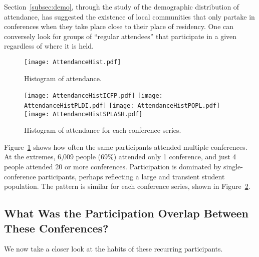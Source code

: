 Section~\ref{subsec:demo}, through the study of the demographic distribution of
attendance, has suggested the existence of local communities that only
partake in conferences when they take place close to their place of residency.
One can conversely look for groups of ``regular attendees'' that participate in
a given \conf regardless of where it is held.

\begin{figure}
  \centering
  \texttt{[image: AttendanceHist.pdf]}
  \caption{Histogram of attendance.}
  \label{fig:hist_attendance}
\end{figure}

\begin{figure}
  \centering
  \texttt{[image: AttendanceHistICFP.pdf]}
  \texttt{[image: AttendanceHistPLDI.pdf]}
  \texttt{[image: AttendanceHistPOPL.pdf]}
  \texttt{[image: AttendanceHistSPLASH.pdf]}
  \caption{Histogram of attendance for each conference series.}
  \label{fig:hist_attendance_per_conference}
\end{figure}

Figure~\ref{fig:hist_attendance} shows how often the same participants attended
multiple conferences. At the extremes, 6,009 people (69\%) attended only 1
conference, and just 4 people attended 20 or more conferences. Participation is
dominated by single-conference participants, perhaps reflecting a large and
transient student population. The pattern is similar for each conference series,
shown in Figure~\ref{fig:hist_attendance_per_conference}.


\subsection{What Was the Participation Overlap Between These Conferences?}

We now take a closer look at the habits of these recurring participants.

